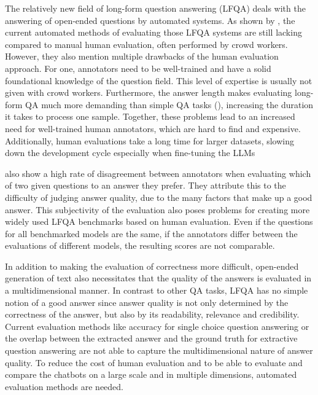 The relatively new field of long-form question answering (LFQA) deals with the answering of open-ended questions by automated systems.
As shown by \cite{xu:2023:A}, the current automated methods of evaluating those LFQA systems are still lacking compared to manual human evaluation, often performed by crowd workers.
However, they also mention multiple drawbacks of the human evaluation approach.
For one, annotators need to be well-trained and have a solid foundational knowledge of the question field.
This level of expertise is usually not given with crowd workers.
Furthermore, the answer length makes evaluating long-form QA much more demanding than simple QA tasks (\cite{krishna:2021:Hurdles}), increasing the duration it takes to process one sample.
Together, these problems lead to an increased need for well-trained human annotators, which are hard to find and expensive.
Additionally, human evaluations take a long time for larger datasets, slowing down the development cycle especially when fine-tuning the LLMs

\cite{krishna:2021:Hurdles} also show a high rate of disagreement between annotators when evaluating which of two given questions to an answer they prefer.
They attribute this to the difficulty of judging answer quality, due to the many factors that make up a good answer.
This subjectivity of the evaluation also poses problems for creating more widely used LFQA benchmarks based on human evaluation.
Even if the questions for all benchmarked models are the same, if the annotators differ between the evaluations of different models, the resulting scores are not comparable.

In addition to making the evaluation of correctness more difficult, open-ended generation of text also necessitates that the quality of the answers is evaluated in a multidimensional manner.
In contrast to other QA tasks, LFQA has no simple notion of a good answer since answer quality is not only determined by the correctness of the answer, but also by its readability, relevance and credibility.
Current evaluation methods like accuracy for single choice question answering or the overlap between the extracted answer and the ground truth for extractive question answering are not able to capture the multidimensional nature of answer quality.
To reduce the cost of human evaluation and to be able to evaluate and compare the chatbots on a large scale and in multiple dimensions, automated evaluation methods are needed.


